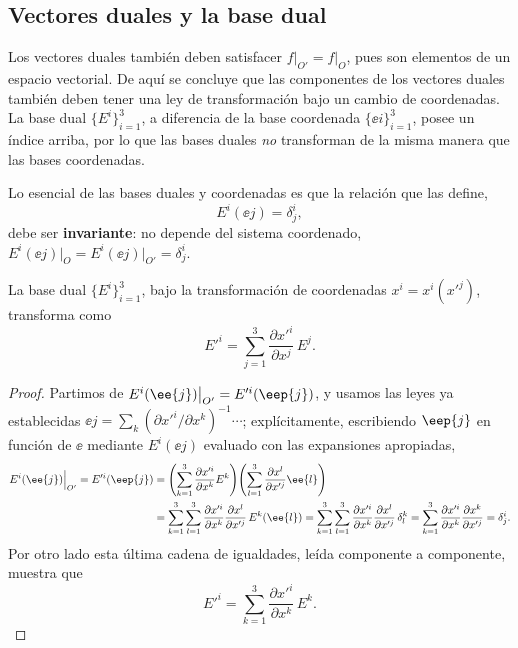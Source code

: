 \subsection{Vectores duales y la base dual}

Los vectores duales también deben satisfacer $f\big|_{O'} = f\big|_{O}$, pues son elementos de un espacio vectorial. De aquí se concluye que las componentes de los vectores duales también deben tener una ley de transformación bajo un cambio de coordenadas. La base dual $\{E^i\}_{i=1}^3$, a diferencia de la base coordenada $\{\ee{i}\}_{i=1}^3$, posee un índice arriba, por lo que las bases duales \emph{no} transforman de la misma manera que las bases coordenadas.

Lo esencial de las bases duales y coordenadas es que la relación que las define,
\begin{equation}
E^i(\ee{j}) = \delta^i_j ,
\end{equation}
debe ser \textbf{invariante}: no depende del sistema coordenado, $E^i(\ee{j})\big|_O = E^i(\ee{j})\big|_{O'} = \delta^i_j$.

\begin{proposicion}\label{prop:dual}
La base dual $\{E^i\}_{i=1}^3$, bajo la transformación de coordenadas $x^i=x^i(x'^j)$, transforma como
\begin{equation}
E'^i = \sum_{j=1}^3 \frac{\partial x'^i}{\partial x^j}\, E^j .
\end{equation}
\end{proposicion}

\begin{proof}
Partimos de $E^i(\ee{j})\big|_{O'} = E'^i(\eep{j})$, y usamos las leyes ya establecidas $\ee{j}=\sum_k (\partial x'^i/\partial x^k)^{-1}\cdots$; explícitamente, escribiendo $\eep{j}$ en función de $\ee{}$ mediante $E^i(\ee{j})$ evaluado con las expansiones apropiadas,
\begin{align}
E^i(\ee{j})\Big|_{O'} = E'^i(\eep{j})
&= \left(\sum_{k=1}^3\frac{\partial x'^i}{\partial x^k}E^k\right)\!\left(\sum_{l=1}^3\frac{\partial x^l}{\partial x'^j}\ee{l}\right) \notag\\
&= \sum_{k=1}^3\sum_{l=1}^3 \frac{\partial x'^i}{\partial x^k}\frac{\partial x^l}{\partial x'^j}\, E^k(\ee{l})
= \sum_{k=1}^3\sum_{l=1}^3 \frac{\partial x'^i}{\partial x^k}\frac{\partial x^l}{\partial x'^j}\,\delta^k_l
= \sum_{k=1}^3 \frac{\partial x'^i}{\partial x^k}\frac{\partial x^k}{\partial x'^j} = \delta^i_j .
\end{align}
Por otro lado esta última cadena de igualdades, leída componente a componente, muestra que
\begin{equation}
E'^i = \sum_{k=1}^3 \frac{\partial x'^i}{\partial x^k}\, E^k .
\end{equation}
\end{proof}

